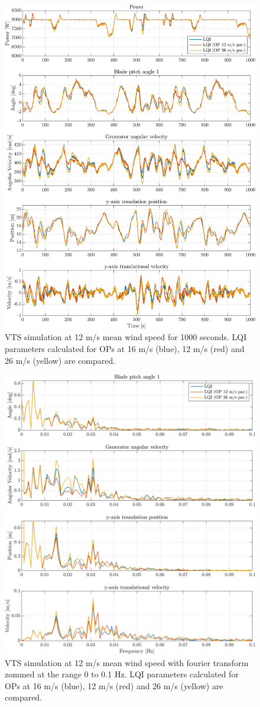 \begin{figure}[ht]
	\centering
	\includegraphics[width=0.7\linewidth]{Graphics/TestResults/VTSplotting/20_pow_th_w_py_vy.png}
	\caption{VTS simulation at 12 m/s mean wind speed for 1000 seconds. LQI parameters calculated for OPs at 16 m/s (blue), 12 m/s (red) and 26 m/s (yellow) are compared.}
	\label{fig:vts_20_pow_th_w_py_vy}
\end{figure}
\begin{figure}[ht]
	\centering
	\includegraphics[width=0.7\linewidth]{Graphics/TestResults/VTSplotting/21_fft_th_w_py_vy.png}
	\caption{VTS simulation at 12 m/s mean wind speed with fourier transform zommed at the range 0 to 0.1 Hz. LQI parameters calculated for OPs at 16 m/s (blue), 12 m/s (red) and 26 m/s (yellow) are compared.}
	\label{fig:vts_21_fft_th_w_py_vy}
\end{figure}

